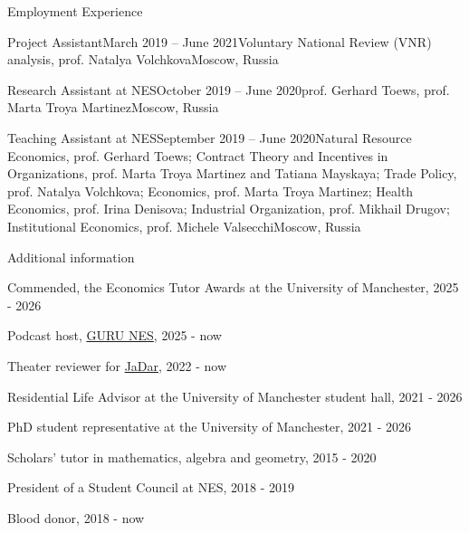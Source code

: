 \documentclass{resume} %
\begin{document}
\begin{rSection}{Employment Experience}
\begin{rSubsection}{Project Assistant}{March 2019 -- June 2021}{Voluntary National Review (VNR) analysis, prof. Natalya Volchkova}{Moscow, Russia}
\end{rSubsection}

\begin{rSubsection}{Research Assistant at NES}{October 2019 -- June 2020}{prof. Gerhard Toews, prof. Marta Troya Martinez}{Moscow, Russia}
\end{rSubsection}

\begin{rSubsection}{Teaching Assistant at NES}{September 2019 -- June 2020}{Natural Resource Economics, prof. Gerhard Toews; Contract Theory and Incentives in Organizations, prof. Marta Troya Martinez and Tatiana Mayskaya; Trade Policy, prof. Natalya Volchkova; Economics, prof. Marta Troya Martinez; Health Economics, prof. Irina Denisova; Industrial Organization, prof. Mikhail Drugov; Institutional Economics, prof. Michele Valsecchi}{Moscow, Russia}
\end{rSubsection}

\end{rSection}



\begin{rSection}{Additional information}
\item Commended, the Economics Tutor Awards at the University of Manchester, 2025 - 2026 
\item Podcast host, \href{https://guru.nes.ru/en/podcasts/ekonomika-na-slux/}{GURU NES}, 2025 - now
\item Theater reviewer for \href{https://jadar.uk/sample-page/}{JaDar}, 2022 - now
\item Residential Life Advisor at the University of Manchester student hall, 2021 - 2026
\item PhD student representative at the University of Manchester, 2021 - 2026
\item Scholars' tutor in mathematics, algebra and geometry, 2015 - 2020
\item President of a Student Council at NES, 2018 - 2019
\item Blood donor, 2018 - now
\end{rSection}
\end{document}
